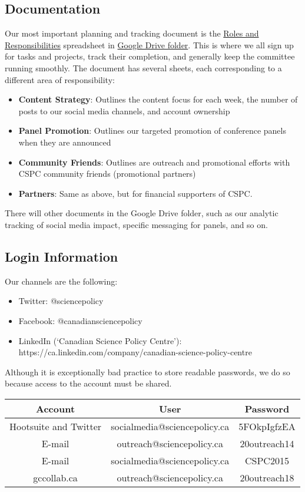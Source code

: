 \documentclass[11pt]{amsart}
\begin{document}
\subsection{Documentation}
Our most important planning and tracking document is the \href{https://docs.google.com/spreadsheets/d/1lpFBDv1iNDUWX_q2PlV3-wX9bY-DUmBBHCQLArtSenY/edit?usp=sharing}{Roles and Responsibilities} spreadsheet in \href{https://drive.google.com/drive/folders/1JjcAsWjjbja4auyTV0g8y4WW9DR7mqMj}{Google Drive folder}.
This is where we all sign up for tasks and projects, track their completion, and generally keep the committee running smoothly.
The document has several sheets, each corresponding to a different area of responsibility:
\begin{itemize}
\item \textbf{Content Strategy}: Outlines the content focus for each week, the number of posts to our social media channels, and account ownership
\item \textbf{Panel Promotion}: Outlines our targeted promotion of conference panels when they are announced
\item \textbf{Community Friends}: Outlines are outreach and promotional efforts with CSPC community friends (promotional partners)
\item \textbf{Partners}: Same as above, but for financial supporters of CSPC.
\end{itemize}
There will other documents in the Google Drive folder, such as our analytic tracking of social media impact, specific messaging for panels, and so on.
\subsection{Login Information}
Our channels are the following:
\begin{itemize}
\item Twitter: @sciencepolicy
\item Facebook: @canadiansciencepolicy
\item LinkedIn (`Canadian Science Policy Centre'): https://ca.linkedin.com/company/canadian-science-policy-centre
\end{itemize}
Although it is exceptionally bad practice to store readable passwords, we do so because access to the account must be shared.
\begin{table}
\centering
\begin{tabular}{|c|c|c|}\hline
Account & User & Password \\\hline
Hootsuite and Twitter & socialmedia@sciencepolicy.ca & 5FOkpIgfzEA \\\hline
E-mail & outreach@sciencepolicy.ca & 20outreach14 \\\hline
E-mail & socialmedia@sciencepolicy.ca	& CSPC2015 \\\hline
gccollab.ca & outreach@sciencepolicy.ca & 20outreach18 \\\hline
\end{tabular}
\end{table}
\end{document}
